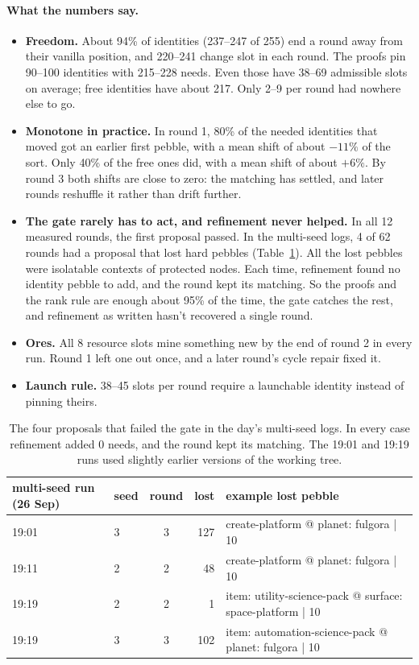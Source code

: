 \paragraph{What the numbers say.}
\begin{itemize}
  \item \textbf{Freedom.} About 94\% of identities (237--247 of 255) end a round away from their vanilla position, and 220--241 change slot in each round. The proofs pin 90--100 identities with 215--228 needs. Even those have 38--69 admissible slots on average; free identities have about 217. Only 2--9 per round had nowhere else to go.
  \item \textbf{Monotone in practice.} In round 1, 80\% of the needed identities that moved got an earlier first pebble, with a mean shift of about $-11\%$ of the sort. Only 40\% of the free ones did, with a mean shift of about $+6\%$. By round 3 both shifts are close to zero: the matching has settled, and later rounds reshuffle it rather than drift further.
  \item \textbf{The gate rarely has to act, and refinement never helped.} In all 12 measured rounds, the first proposal passed. In the multi-seed logs, 4 of 62 rounds had a proposal that lost hard pebbles (Table~\ref{tab:failed}). All the lost pebbles were isolatable contexts of protected nodes. Each time, refinement found no identity pebble to add, and the round kept its matching. So the proofs and the rank rule are enough about 95\% of the time, the gate catches the rest, and refinement as written hasn't recovered a single round.
  \item \textbf{Ores.} All 8 resource slots mine something new by the end of round 2 in every run. Round 1 left one out once, and a later round's cycle repair fixed it.
  \item \textbf{Launch rule.} 38--45 slots per round require a launchable identity instead of pinning theirs.
\end{itemize}

\begin{table}[H]
\centering\footnotesize
\setlength{\tabcolsep}{4pt}
\begin{tabular}{@{}llcr>{\scriptsize\ttfamily}l@{}}
\toprule
multi-seed run (26 Sep) & seed & round & lost & example lost pebble\\
\midrule
19:01 & 3 & 3 & 127 & create-platform @ planet: fulgora | 10\\
19:11 & 2 & 2 & 48 & create-platform @ planet: fulgora | 10\\
19:19 & 2 & 2 & 1 & item: utility-science-pack @ surface: space-platform | 10\\
19:19 & 3 & 3 & 102 & item: automation-science-pack @ planet: fulgora | 10\\
\bottomrule
\end{tabular}
\caption{The four proposals that failed the gate in the day's multi-seed logs. In every case refinement added 0 needs, and the round kept its matching. The 19:01 and 19:19 runs used slightly earlier versions of the working tree.}
\label{tab:failed}
\end{table}

